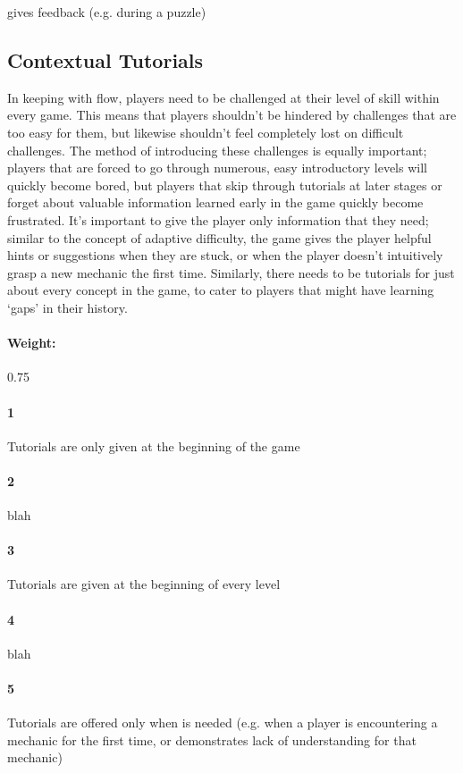 gives feedback (e.g. during a puzzle)\subsection{Contextual Tutorials}{In keeping with flow, players need to be challenged at their level of skill within every game. This means that players shouldn't be hindered by challenges that are too easy for them, but likewise shouldn't feel completely lost on difficult challenges. The method of introducing these challenges is equally important; players that are forced to go through numerous, easy introductory levels will quickly become bored, but players that skip through tutorials at later stages or forget about valuable information learned early in the game quickly become frustrated. It's important to give the player only information that they need; similar to the concept of adaptive difficulty, the game gives the player helpful hints or suggestions when they are stuck, or when the player doesn't intuitively grasp a new mechanic the first time. Similarly, there needs to be tutorials for just about every concept in the game, to cater to players that might have learning ‘gaps' in their history.} \paragraph{Weight:}{0.75}\paragraph{1}Tutorials are only given at the beginning of the game\paragraph{2}blah\paragraph{3}Tutorials are given at the beginning of every level\paragraph{4}blah\paragraph{5}Tutorials are offered only when is needed (e.g. when a player is encountering a mechanic for the first time, or demonstrates lack of understanding for that mechanic)